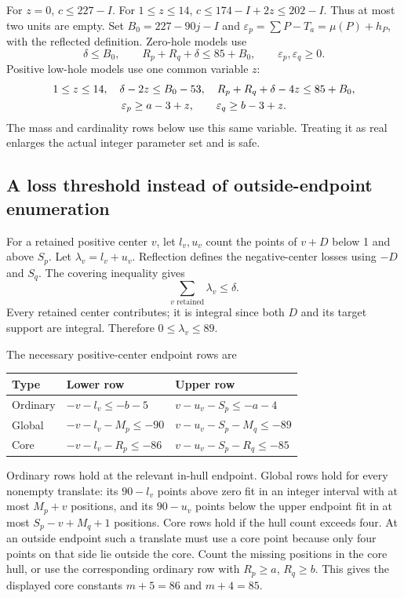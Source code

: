 \documentclass[11pt,a4paper]{article}
\begin{document}
For $z=0$, $c\le227-I$. For $1\le z\le14$,
$c\le174-I+2z\le202-I$. Thus at most two units are empty.
Set $B_0=227-90j-I$ and
$\varepsilon_p=\sum P-T_a=\mu(P)+h_P$, with the reflected definition.
Zero-hole models use
\begin{equation}\label{eq:Z}
 \delta\le B_0,\qquad R_p+R_q+\delta\le85+B_0,
 \qquad\varepsilon_p,\varepsilon_q\ge0.
\end{equation}
Positive low-hole models use one common variable $z$:
\begin{gather}
 1\le z\le14,\quad\delta-2z\le B_0-53,
 \quad R_p+R_q+\delta-4z\le85+B_0,\notag\\
 \varepsilon_p\ge a-3+z,\qquad
 \varepsilon_q\ge b-3+z.\label{eq:P}
\end{gather}
The mass and cardinality rows below use this same variable. Treating it
as real enlarges the actual integer parameter set and is safe.

\subsection{A loss threshold instead of outside-endpoint enumeration}
For a retained positive center $v$, let $l_v,u_v$ count the points of
$v+D$ below 1 and above $S_p$. Let $\lambda_v=l_v+u_v$.
Reflection defines the negative-center losses using $-D$ and $S_q$.
The covering inequality gives
\begin{equation}\label{eq:loss}
 \sum_{v\text{ retained}}\lambda_v\le\delta.
\end{equation}
Every retained center contributes; it is integral since both $D$ and its
target support are integral. Therefore $0\le\lambda_v\le89$.

The necessary positive-center endpoint rows are
\begin{center}\small
\begin{tabular}{lll}
\toprule
Type&Lower row&Upper row\\
\midrule
Ordinary&$-v-l_v\le-b-5$&$v-u_v-S_p\le-a-4$\\
Global&$-v-l_v-M_p\le-90$&$v-u_v-S_p-M_q\le-89$\\
Core&$-v-l_v-R_p\le-86$&$v-u_v-S_p-R_q\le-85$\\
\bottomrule
\end{tabular}
\end{center}
Ordinary rows hold at the relevant in-hull endpoint. Global rows hold
for every nonempty translate: its $90-l_v$ points above zero fit in
an integer interval with at most $M_p+v$ positions, and its $90-u_v$
points below the upper endpoint fit in at most $S_p-v+M_q+1$ positions.
Core rows hold if the hull count exceeds four. At an outside endpoint
such a translate must use a core point because only four points on that
side lie outside the core. Count the missing positions in the core hull,
or use the corresponding ordinary row with $R_p\ge a$, $R_q\ge b$.
This gives the displayed core constants $m+5=86$ and $m+4=85$.
\end{document}
